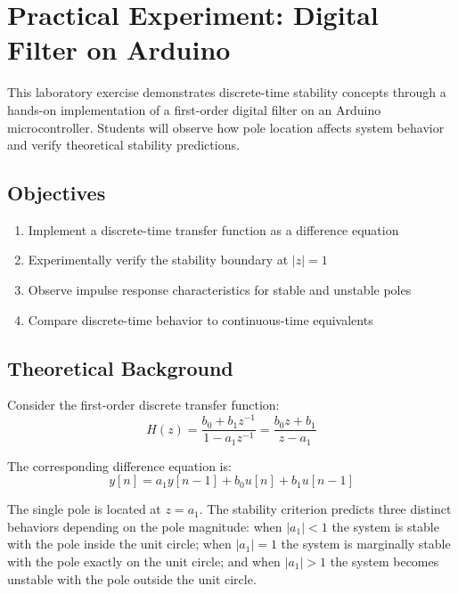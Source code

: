 \section{Practical Experiment: Digital Filter on Arduino}

This laboratory exercise demonstrates discrete-time stability concepts through a hands-on implementation of a first-order digital filter on an Arduino microcontroller. Students will observe how pole location affects system behavior and verify theoretical stability predictions.

\subsection{Objectives}

\begin{enumerate}
    \item Implement a discrete-time transfer function as a difference equation
    \item Experimentally verify the stability boundary at $|z| = 1$
    \item Observe impulse response characteristics for stable and unstable poles
    \item Compare discrete-time behavior to continuous-time equivalents
\end{enumerate}

\subsection{Theoretical Background}

Consider the first-order discrete transfer function:
\begin{equation}
H(z) = \frac{b_0 + b_1 z^{-1}}{1 - a_1 z^{-1}} = \frac{b_0 z + b_1}{z - a_1}
\end{equation}

The corresponding difference equation is:
\begin{equation}
y[n] = a_1 y[n-1] + b_0 u[n] + b_1 u[n-1]
\end{equation}

The single pole is located at $z = a_1$. The stability criterion predicts three distinct behaviors depending on the pole magnitude: when $|a_1| < 1$ the system is stable with the pole inside the unit circle; when $|a_1| = 1$ the system is marginally stable with the pole exactly on the unit circle; and when $|a_1| > 1$ the system becomes unstable with the pole outside the unit circle.

